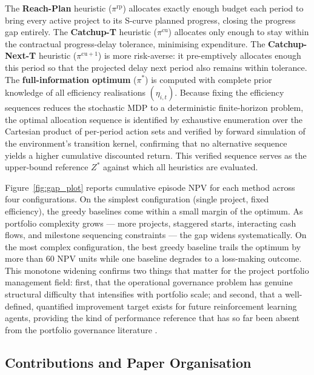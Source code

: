 The \textbf{Reach-Plan} heuristic ($\pi^{\mathrm{rp}}$) allocates
exactly enough budget each period to bring every active project to
its S-curve planned progress, closing the progress gap entirely.
The \textbf{Catchup-T} heuristic ($\pi^{\mathrm{cu}}$) allocates
only enough to stay within the contractual progress-delay tolerance,
minimising expenditure. The \textbf{Catchup-Next-T} heuristic
($\pi^{\mathrm{cu}+1}$) is more risk-averse: it pre-emptively
allocates enough this period so that the projected delay next period
also remains within tolerance. The \textbf{full-information optimum}
($\pi^*$) is computed with complete prior knowledge of all efficiency
realisations $(\eta_{i,t})$. Because fixing the efficiency sequences
reduces the stochastic MDP to a deterministic finite-horizon problem,
the optimal allocation sequence is identified by exhaustive enumeration
over the Cartesian product of per-period action sets and verified by
forward simulation of the environment's transition kernel, confirming
that no alternative sequence yields a higher cumulative discounted
return. This verified sequence serves as the upper-bound reference
$Z^*$ against which all heuristics are evaluated.

Figure~\ref{fig:gap_plot} reports cumulative episode NPV for each
method across four configurations. On the simplest configuration
(single project, fixed efficiency), the greedy baselines come within
a small margin of the optimum. As portfolio complexity grows --- more
projects, staggered starts, interacting cash flows, and milestone
sequencing constraints --- the gap widens systematically. On the most
complex configuration, the best greedy baseline trails the optimum
by more than 60 NPV units while one baseline degrades to a
loss-making outcome. This monotone widening confirms two things that
matter for the project portfolio management field: first, that the
operational governance problem has genuine structural difficulty that
intensifies with portfolio scale; and second, that a well-defined,
quantified improvement target exists for future reinforcement learning
agents, providing the kind of performance reference that has so far
been absent from the portfolio governance literature
\citep{Mariani2026, Pompei2026}.

\subsection{Contributions and Paper Organisation}
\label{subsec:organisation}

